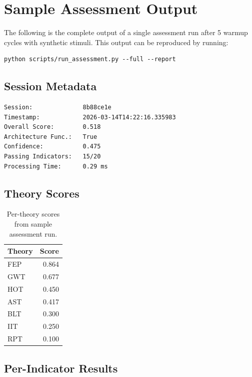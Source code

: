 \section{Sample Assessment Output}\label{app:output}

The following is the complete output of a single assessment run after 5 warmup cycles with synthetic stimuli.
This output can be reproduced by running:

\begin{lstlisting}[language={}]
python scripts/run_assessment.py --full --report
\end{lstlisting}

\subsection{Session Metadata}

\begin{lstlisting}[language={}]
Session:              8b88ce1e
Timestamp:            2026-03-14T14:22:16.335983
Overall Score:        0.518
Architecture Func.:   True
Confidence:           0.475
Passing Indicators:   15/20
Processing Time:      0.29 ms
\end{lstlisting}

\subsection{Theory Scores}

\begin{table}[ht]
\centering
\begin{tabular}{@{}lr@{}}
\toprule
\textbf{Theory} & \textbf{Score} \\
\midrule
FEP & 0.864 \\
GWT & 0.677 \\
HOT & 0.450 \\
AST & 0.417 \\
BLT & 0.300 \\
IIT & 0.250 \\
RPT & 0.100 \\
\bottomrule
\end{tabular}
\caption{Per-theory scores from sample assessment run.}
\label{tab:sample-theory-scores}
\end{table}

\subsection{Per-Indicator Results}

